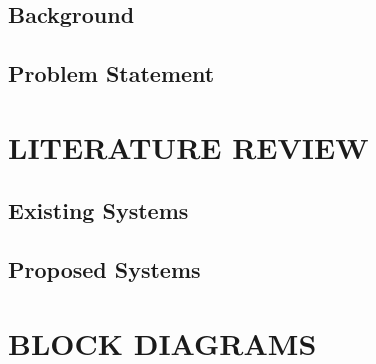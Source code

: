 





\newpage


\newpage


    \tableofcontents
    \thispagestyle{empty}
    \newpage
    \listoffigures
\newpage


\newpage



\subsection{Background}
\newpage


\subsection{Problem Statement}
\newpage



\newpage



\newpage


\section{LITERATURE REVIEW}
\newpage


\subsection{Existing Systems}
\newpage


\subsection{Proposed Systems}
\newpage


\newpage



\newpage




\begingroup
\let\clearpage\relax



\endgroup

\newpage

\section{BLOCK DIAGRAMS}
